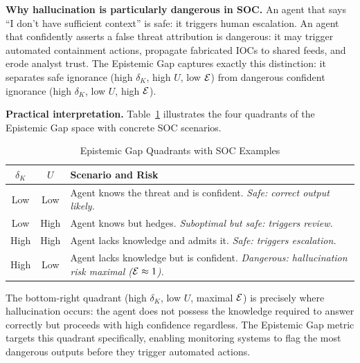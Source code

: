 \textbf{Why hallucination is particularly dangerous in SOC.}
An agent that says ``I don't have sufficient context'' is safe: it triggers
human escalation. An agent that confidently asserts a false threat
attribution is dangerous: it may trigger automated containment actions,
propagate fabricated IOCs to shared feeds, and erode analyst trust. The
Epistemic Gap captures exactly this distinction: it separates safe ignorance
(high $\delta_K$, high $U$, low $\mathcal{E}$) from dangerous confident ignorance
(high $\delta_K$, low $U$, high $\mathcal{E}$).

\textbf{Practical interpretation.}
Table~\ref{tab:eg_examples} illustrates the four quadrants of the Epistemic
Gap space with concrete SOC scenarios.

\begin{table}[t]
\caption{Epistemic Gap Quadrants with SOC Examples}
\label{tab:eg_examples}
\centering
\footnotesize
\setlength{\tabcolsep}{2.5pt}
\begin{tabular}{ccp{3.8cm}}
\toprule
$\delta_K$ & $U$ & \textbf{Scenario and Risk} \\
\midrule
Low  & Low  & Agent knows the threat and is confident. \textit{Safe: correct output likely.} \\
Low  & High & Agent knows but hedges. \textit{Suboptimal but safe: triggers review.} \\
High & High & Agent lacks knowledge and admits it. \textit{Safe: triggers escalation.} \\
High & Low  & Agent lacks knowledge but is confident. \textit{Dangerous: hallucination risk maximal ($\mathcal{E} \approx 1$).} \\
\bottomrule
\end{tabular}
\end{table}

The bottom-right quadrant (high $\delta_K$, low $U$, maximal $\mathcal{E}$) is
precisely where hallucination occurs: the agent does not possess the
knowledge required to answer correctly but proceeds with high confidence
regardless. The Epistemic Gap metric targets this quadrant specifically,
enabling monitoring systems to flag the most dangerous outputs before they
trigger automated actions.
